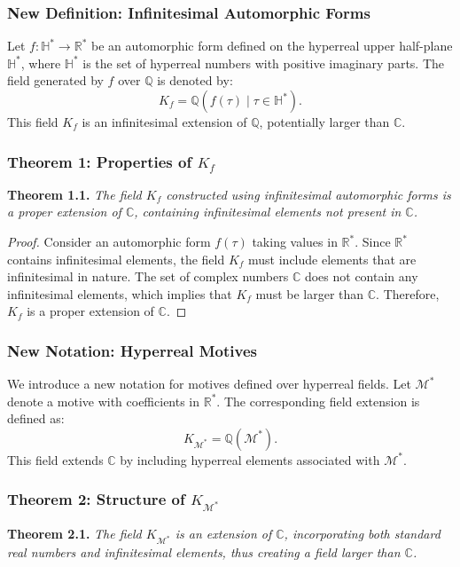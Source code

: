 \documentclass{article}
\begin{document}
\subsubsection{New Definition: Infinitesimal Automorphic Forms}
Let \(f: \mathbb{H}^* \to \mathbb{R}^*\) be an automorphic form defined on the hyperreal upper half-plane \(\mathbb{H}^*\), where \(\mathbb{H}^*\) is the set of hyperreal numbers with positive imaginary parts. The field generated by \(f\) over \(\mathbb{Q}\) is denoted by:
\[
K_f = \mathbb{Q}(f(\tau) \mid \tau \in \mathbb{H}^*).
\]
This field \(K_f\) is an infinitesimal extension of \(\mathbb{Q}\), potentially larger than \(\mathbb{C}\).

\subsubsection{Theorem 1: Properties of \(K_f\)}
\textbf{Theorem 1.1.} \textit{The field \(K_f\) constructed using infinitesimal automorphic forms is a proper extension of \(\mathbb{C}\), containing infinitesimal elements not present in \(\mathbb{C}\).}

\begin{proof}
Consider an automorphic form \(f(\tau)\) taking values in \(\mathbb{R}^*\). Since \(\mathbb{R}^*\) contains infinitesimal elements, the field \(K_f\) must include elements that are infinitesimal in nature. The set of complex numbers \(\mathbb{C}\) does not contain any infinitesimal elements, which implies that \(K_f\) must be larger than \(\mathbb{C}\). Therefore, \(K_f\) is a proper extension of \(\mathbb{C}\).
\end{proof}

\subsubsection{New Notation: Hyperreal Motives}
We introduce a new notation for motives defined over hyperreal fields. Let \(\mathcal{M}^*\) denote a motive with coefficients in \(\mathbb{R}^*\). The corresponding field extension is defined as:
\[
K_{\mathcal{M}^*} = \mathbb{Q}(\mathcal{M}^*).
\]
This field extends \(\mathbb{C}\) by including hyperreal elements associated with \(\mathcal{M}^*\).

\subsubsection{Theorem 2: Structure of \(K_{\mathcal{M}^*}\)}
\textbf{Theorem 2.1.} \textit{The field \(K_{\mathcal{M}^*}\) is an extension of \(\mathbb{C}\), incorporating both standard real numbers and infinitesimal elements, thus creating a field larger than \(\mathbb{C}\).}
\end{document}
